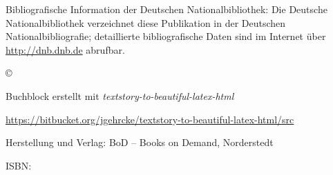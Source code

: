 \thispagestyle{empty}

\vspace*{\fill}

{\small
\noindent
Bibliografische Information der Deutschen Nationalbibliothek:
Die Deutsche Nationalbibliothek verzeichnet diese Publikation in der Deutschen Nationalbibliografie; detaillierte bibliografische Daten sind im Internet über 
\url{http://dnb.dnb.de} abrufbar.

\vspace*{0.06\textheight}
\noindent
© {\the\year} \storyauthor


\vspace{0.03\textheight}\noindent
Buchblock erstellt mit \textit{textstory-to-beautiful-latex-html}

{\noindent\scriptsize \url{https://bitbucket.org/jgehrcke/textstory-to-beautiful-latex-html/src}}

\vspace*{0.06\textheight}\noindent
Herstellung und Verlag: BoD –  Books on Demand, Norderstedt

\vspace*{0.03\textheight}
\noindent
ISBN: \isbn
}